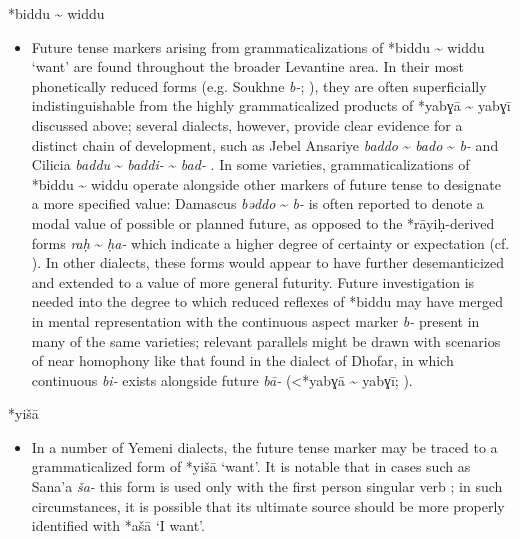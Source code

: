 \documentclass[output=paper]{langsci/langscibook}
\begin{document}
*biddu {\textasciitilde} widdu

\begin{itemize}

  \item[]
Future tense markers arising from grammaticalizations of *biddu {\textasciitilde} widdu ‘want’ are found throughout the broader Levantine area. In their most phonetically reduced forms (e.g. Soukhne \textit{b-}; \citealt{Behnstedt1994Soukhne}), they are often superficially indistinguishable from the highly grammaticalized products of *yabɣā {\textasciitilde} yabɣī discussed above; several dialects, however, provide clear evidence for a distinct chain of development, such as Jebel Ansariye \textit{baddo} {\textasciitilde} \textit{bado} {\textasciitilde} \textit{b-} \citep{Lewin1969} and Cilicia \textit{baddu} {\textasciitilde} \textit{baddi-} {\textasciitilde} \textit{bad-} \citep{Procházka2011Cilician}. In some varieties, grammaticalizations of *biddu {\textasciitilde} widdu operate alongside other markers of future tense to designate a more specified value: Damascus \textit{bǝ}\textit{ddo} {\textasciitilde} \textit{b-} is often reported to denote a modal value of possible or planned future, as opposed to the *rāyiḥ{}-derived forms \textit{raḥ} {\textasciitilde} \textit{ḥa-} which indicate a higher degree of certainty or expectation (cf. \citealt{Lentin2011}). In other dialects, these forms would appear to have further desemanticized and extended to a value of more general futurity.  Future investigation is needed into the degree to which reduced reflexes of *biddu may have merged in mental representation with the continuous aspect marker \textit{b-} present in many of the same varieties; relevant parallels might be drawn with scenarios of near homophony like that found in the dialect of Dhofar, in which continuous \textit{bi-} exists alongside future \textit{bā}\textit{{}-} (<*yabɣā {\textasciitilde} yabɣī; \citealt{Davey2016}).
\end{itemize}
 
*yišā

\begin{itemize}

  \item[]
In a number of Yemeni dialects, the future tense marker may be traced to a grammaticalized form of *yišā ‘want’. It is notable that in cases such as Sana’a \textit{ša-} this form is used only with the first person singular verb \citep{Watson1993}; in such circumstances, it is possible that its ultimate source should be more properly identified with *ašā ‘I want’.
\end{itemize}
 
\end{document}
